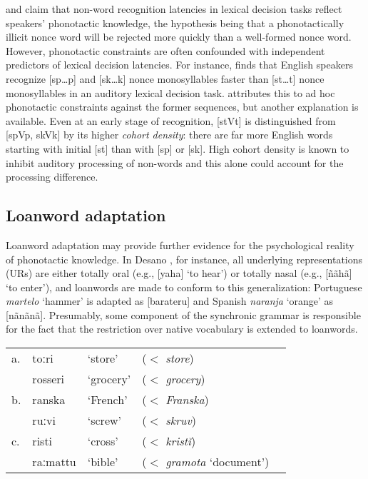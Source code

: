 \citet{Berent2001b} and \citet{Coetzee2008b} claim that non-word recognition latencies in lexical decision tasks reflect speakers' phonotactic knowledge, the hypothesis being that a phonotactically illicit nonce word will be rejected more quickly than a well-formed nonce word.
However, phonotactic constraints are often confounded with independent predictors of lexical decision latencies.
For instance, \citet{Coetzee2008b} finds that English speakers recognize [sp\ldots{}p] and [sk\ldots{}k] nonce monosyllables faster than [st\ldots{}t] nonce monosyllables in an auditory lexical decision task.
\citeauthor{Coetzee2008b} attributes this to ad hoc phonotactic constraints against the former sequences, but another explanation is available.
Even at an early stage of recognition, [stVt] is distinguished from [spVp, skVk] by its higher \emph{cohort density}: there are far more English words starting with initial [st] than with [sp] or [sk].
High cohort density is known to inhibit auditory processing of non-words \citep[e.g.,][]{Marslen-Wilson1978} and this alone could account for the processing difference.

\subsection{Loanword adaptation}

Loanword adaptation may provide further evidence for the psychological reality of phonotactic knowledge.
In Desano \citep{Kaye1974}, for instance, all underlying representations (URs) are either totally oral (e.g., [yaha] `to hear') or totally nasal (e.g., [ñãhã] `to enter'), and loanwords are made to conform to this generalization: Portuguese \emph{martelo} `hammer' is adapted as [barateru] and Spanish \emph{naranja} `orange' as [nãnãnã].
Presumably, some component of the synchronic grammar is responsible for the fact that the restriction over native vocabulary is extended to loanwords.


\begin{example}
\begin{tabular}{l llll}
a. & toːri    & `store'   & ($<$ \emph{store})              & \citep[English:][89]{Hellstrom1976}   \\
   & rosseri  & `grocery' & ($<$ \emph{grocery})            &                             \\
b. & ranska   & `French'  & ($<$ \emph{Franska})            & \citep[Swedish:][67]{Campbell2004}    \\
   & ruːvi    & `screw'   & ($<$ \emph{skruv})              &                             \\
c. & risti    & `cross'   & ($<$ \emph{kristĭ})             & \citep[Old Russian:][60]{Bjornflaten2006} \\
   & raːmattu & `bible'   & ($<$ \emph{gramota} `document') &                             \\
\end{tabular}
\end{example}

